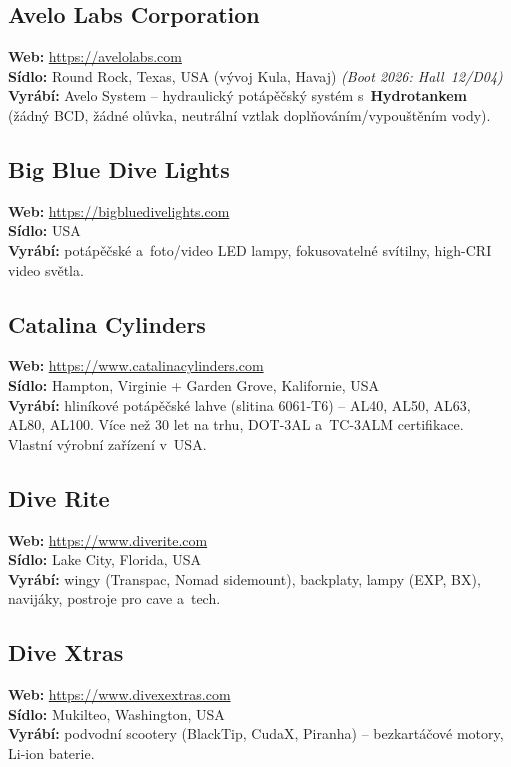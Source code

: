 \documentclass[11pt,a4paper]{article}
\begin{document}
\subsection{Avelo Labs Corporation}
\textbf{Web:} \url{https://avelolabs.com} \\
\textbf{Sídlo:} Round Rock, Texas, USA (vývoj Kula, Havaj) \quad\emph{(Boot 2026: Hall~12/D04)} \\
\textbf{Vyrábí:} Avelo System -- hydraulický potápěčský systém s~\textbf{Hydrotankem} (žádný BCD, žádné olůvka, neutrální vztlak doplňováním/vypouštěním vody).

\subsection{Big Blue Dive Lights}
\textbf{Web:} \url{https://bigbluedivelights.com} \\
\textbf{Sídlo:} USA \\
\textbf{Vyrábí:} potápěčské a~foto/video LED lampy, fokusovatelné svítilny, high-CRI video světla.

\subsection{Catalina Cylinders}
\textbf{Web:} \url{https://www.catalinacylinders.com} \\
\textbf{Sídlo:} Hampton, Virginie + Garden Grove, Kalifornie, USA \\
\textbf{Vyrábí:} hliníkové potápěčské lahve (slitina 6061-T6) -- AL40, AL50, AL63, AL80, AL100. Více než 30 let na trhu, DOT-3AL a~TC-3ALM certifikace. Vlastní výrobní zařízení v~USA.

\subsection{Dive Rite}
\textbf{Web:} \url{https://www.diverite.com} \\
\textbf{Sídlo:} Lake City, Florida, USA \\
\textbf{Vyrábí:} wingy (Transpac, Nomad sidemount), backplaty, lampy (EXP, BX), navijáky, postroje pro cave a~tech.

\subsection{Dive Xtras}
\textbf{Web:} \url{https://www.divexextras.com} \\
\textbf{Sídlo:} Mukilteo, Washington, USA \\
\textbf{Vyrábí:} podvodní scootery (BlackTip, CudaX, Piranha) -- bezkartáčové motory, Li-ion baterie.
\end{document}
